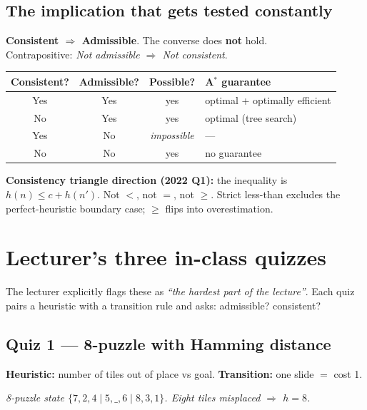 \documentclass[11pt, a4paper]{article}
\newcommand{\thead}[1]{\textbf{#1}}
\begin{document}
\subsection{The implication that gets tested constantly}

\begin{factbox}
\textbf{Consistent $\Rightarrow$ Admissible}. The converse does \textbf{not} hold. \\
Contrapositive: \emph{Not admissible $\Rightarrow$ Not consistent}.
\end{factbox}

\begin{center}
\renewcommand{\arraystretch}{1.15}
\begin{tabular}{@{}cccl@{}}
\toprule
\thead{Consistent?} & \thead{Admissible?} & \thead{Possible?} & \thead{A$^{*}$ guarantee} \\
\midrule
Yes & Yes & yes & optimal + optimally efficient \\
No  & Yes & yes & optimal (tree search) \\
Yes & No  & \emph{impossible} & --- \\
No  & No  & yes & no guarantee \\
\bottomrule
\end{tabular}
\end{center}

\textbf{Consistency triangle direction (2022 Q1):} the inequality is $h(n) \le c + h(n')$. Not $<$, not $=$, not $\ge$. Strict less-than excludes the perfect-heuristic boundary case; $\ge$ flips into overestimation.

\section{Lecturer's three in-class quizzes}

The lecturer explicitly flags these as \emph{``the hardest part of the lecture''}. Each quiz pairs a heuristic with a transition rule and asks: admissible? consistent?

\subsection{Quiz 1 --- 8-puzzle with Hamming distance}

\textbf{Heuristic:} number of tiles out of place vs goal. \textbf{Transition:} one slide $=$ cost 1.

\begin{center}

\footnotesize\textit{8-puzzle state $\{7,2,4 \mid 5,\_,6 \mid 8,3,1\}$. Eight tiles misplaced $\Rightarrow$ $h = 8$.}
\end{center}
\end{document}
